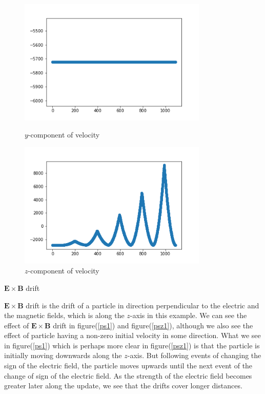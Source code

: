 \documentclass[12pt]{article}
\begin{document}
\begin{figure}[H]
	\begin{multicols}{2}
		\includegraphics[width=\linewidth, height=6cm]{vsy1.png} \caption{$y$-component of velocity} \label{vsy1} \par
		\includegraphics[width=\linewidth, height=6cm]{vsz1.png} \caption{$z$-component of velocity} \label{vsz1} \par
	\end{multicols}
\end{figure}	

\begin{tcolorbox}[width=3cm]
	$\mathbf{E} \times \mathbf{B}$ drift
\end{tcolorbox}
	$\mathbf{E} \times \mathbf{B}$ drift is the drift of a particle in direction perpendicular to the electric and the magnetic fields, which is along the $z$-axis in this example. We can see the effect of $\mathbf{E} \times \mathbf{B}$ drift in figure(\ref{ps1}) and figure(\ref{psz1}), although we also see the effect of particle having a non-zero initial velocity in some direction. What we see in figure(\ref{ps1}) which is perhaps more clear in figure(\ref{psz1}) is that the particle is initially moving downwards along the $z$-axis. But following events of changing the sign of the electric field, the particle moves upwards until the next event of the change of sign of the electric field. As the strength of the electric field becomes greater later along the update, we see that the drifts cover longer distances.
	
\end{document}
